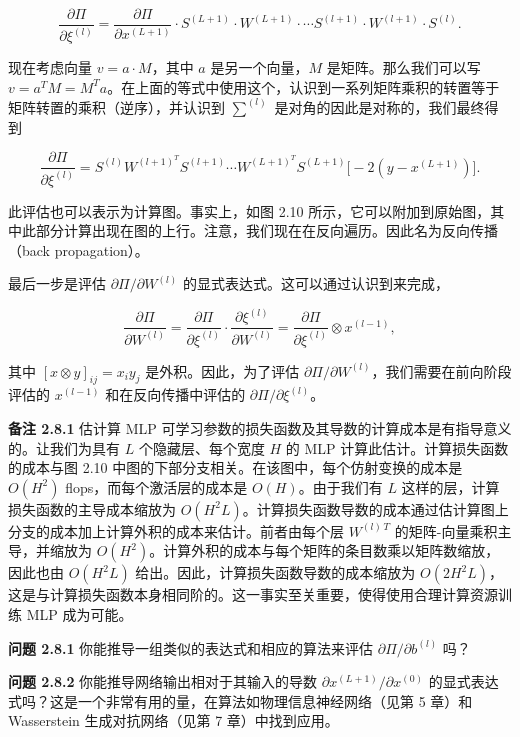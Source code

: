 \[
\frac{\partial \Pi}{\partial \xi^{(l)}} = \frac{\partial \Pi}{\partial x^{(L+1)}} \cdot S^{(L+1)} \cdot W^{(L+1)} \cdot \cdots S^{(l+1)} \cdot W^{(l+1)} \cdot S^{(l)}.
\]

现在考虑向量 $v = a \cdot M$，其中 $a$ 是另一个向量，$M$ 是矩阵。那么我们可以写 $v = a^T M = M^T a$。在上面的等式中使用这个，认识到一系列矩阵乘积的转置等于矩阵转置的乘积（逆序），并认识到 $\sum^{(l)}$ 是对角的因此是对称的，我们最终得到

\[
\frac{\partial \Pi}{\partial \xi^{(l)}} 
= S^{(l)} W^{(l+1)^{T}} S^{(l+1)} \cdots W^{(L+1)^{T}} S^{(L+1)} \big[-2 (y - x^{(L+1)})\big].
\]


此评估也可以表示为计算图。事实上，如图 2.10 所示，它可以附加到原始图，其中此部分计算出现在图的上行。注意，我们现在在反向遍历。因此名为反向传播（back propagation）。

最后一步是评估 $\partial \Pi / \partial W^{(l)}$ 的显式表达式。这可以通过认识到来完成，

\[
\frac{\partial \Pi}{\partial W^{(l)}} = \frac{\partial \Pi}{\partial \xi^{(l)}} \cdot \frac{\partial \xi^{(l)}}{\partial W^{(l)}} = \frac{\partial \Pi}{\partial \xi^{(l)}} \otimes x^{(l-1)},
\]

其中 $[x \otimes y]_{ij} = x_i y_j$ 是外积。因此，为了评估 $\partial \Pi / \partial W^{(l)}$，我们需要在前向阶段评估的 $x^{(l-1)}$ 和在反向传播中评估的 $\partial \Pi / \partial \xi^{(l)}$。

\textbf{备注 2.8.1} 估计算 MLP 可学习参数的损失函数及其导数的计算成本是有指导意义的。让我们为具有 $L$ 个隐藏层、每个宽度 $H$ 的 MLP 计算此估计。计算损失函数的成本与图 2.10 中图的下部分支相关。在该图中，每个仿射变换的成本是 $O(H^2)$ flops，而每个激活层的成本是 $O(H)$。由于我们有 $L$ 这样的层，计算损失函数的主导成本缩放为 $O(H^2 L)$。计算损失函数导数的成本通过估计算图上分支的成本加上计算外积的成本来估计。前者由每个层 $W^{(l)\,T}$ 的矩阵-向量乘积主导，并缩放为 $O(H^2)$。计算外积的成本与每个矩阵的条目数乘以矩阵数缩放，因此也由 $O(H^2 L)$ 给出。因此，计算损失函数导数的成本缩放为 $O(2 H^2 L)$，这是与计算损失函数本身相同阶的。这一事实至关重要，使得使用合理计算资源训练 MLP 成为可能。

\textbf{问题 2.8.1} 你能推导一组类似的表达式和相应的算法来评估 $\partial \Pi / \partial b^{(l)}$ 吗？

\textbf{问题 2.8.2} 你能推导网络输出相对于其输入的导数 $\partial x^{(L+1)} / \partial x^{(0)}$ 的显式表达式吗？这是一个非常有用的量，在算法如物理信息神经网络（见第 5 章）和 Wasserstein 生成对抗网络（见第 7 章）中找到应用。

